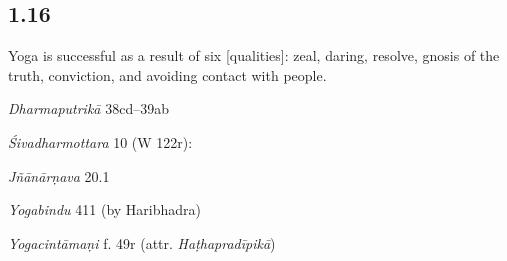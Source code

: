 \begin{ekdosis}
\subsection*{1.16}
\begin{translation}[hp01_016]
Yoga is successful as a result of six [qualities]: zeal, daring, resolve, gnosis of the truth, conviction, and avoiding contact with people.
\end{translation}

\begin{sources}[hp01_016]
\emph{Dharmaputrikā} 38cd–39ab

\begin{versinnote}
\end{versinnote}

\emph{Śivadharmottara} 10 (W 122r):%

\begin{versinnote}
\end{versinnote}

\emph{Jñānārṇava} 20.1

\begin{versinnote}
\end{versinnote}

\emph{Yogabindu} 411 (by Haribhadra)

\begin{versinnote}
\end{versinnote}

\end{sources}

\begin{testimonia}[hp01_016]
\emph{Yogacintāmaṇi} f. 49r (attr. \emph{Haṭhapradīpikā})


\end{testimonia}
\end{ekdosis}
